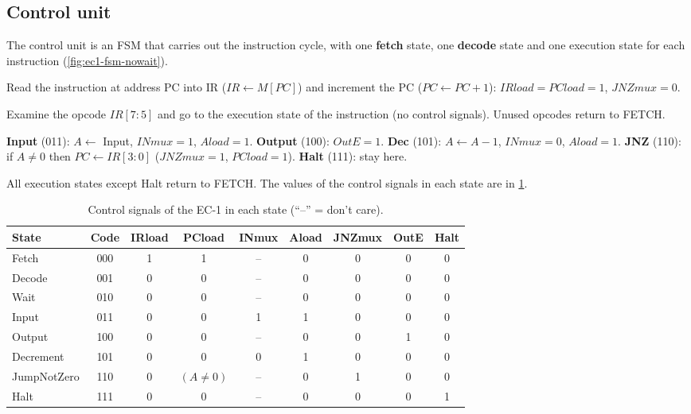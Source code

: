 \subsection{Control unit}
The control unit is an FSM that carries out the instruction cycle, with one \textbf{fetch} state, one \textbf{decode} state and one execution state for each instruction (\cref{fig:ec1-fsm-nowait}).
\begin{description}[font=\sffamily\bfseries, leftmargin=1.2em]
  \item[FETCH (000)] Read the instruction at address PC into IR ($IR\leftarrow M[PC]$) and increment the PC ($PC\leftarrow PC+1$): $IRload=PCload=1$, $JNZmux=0$.
  \item[DECODE (001)] Examine the opcode $IR[7:5]$ and go to the execution state of the instruction (no control signals). Unused opcodes return to FETCH.
  \item[EXECUTE] \textbf{Input} (011): $A\leftarrow$ Input, $INmux=1$, $Aload=1$. \textbf{Output} (100): $OutE=1$. \textbf{Dec} (101): $A\leftarrow A-1$, $INmux=0$, $Aload=1$. \textbf{JNZ} (110): if $A\neq0$ then $PC\leftarrow IR[3:0]$ ($JNZmux=1$, $PCload=1$). \textbf{Halt} (111): stay here.
\end{description}
All execution states except Halt return to FETCH. The values of the control signals in each state are in \cref{tab:ec1-cs}.

\begin{table}[htbp]
\centering
\small
\caption{Control signals of the EC-1 in each state (``--'' = don't care).}
\label{tab:ec1-cs}
\begin{tabular}{lc|ccccccc}
\toprule
State & Code & IRload & PCload & INmux & Aload & JNZmux & OutE & Halt\\ \midrule
Fetch & 000 & 1 & 1 & -- & 0 & 0 & 0 & 0\\
Decode & 001 & 0 & 0 & -- & 0 & 0 & 0 & 0\\
Wait & 010 & 0 & 0 & -- & 0 & 0 & 0 & 0\\
Input & 011 & 0 & 0 & 1 & 1 & 0 & 0 & 0\\
Output & 100 & 0 & 0 & -- & 0 & 0 & 1 & 0\\
Decrement & 101 & 0 & 0 & 0 & 1 & 0 & 0 & 0\\
JumpNotZero & 110 & 0 & $(A\neq0)$ & -- & 0 & 1 & 0 & 0\\
Halt & 111 & 0 & 0 & -- & 0 & 0 & 0 & 1\\ \bottomrule
\end{tabular}
\end{table}

